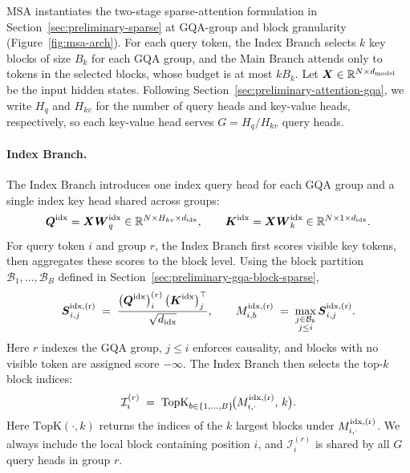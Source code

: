 \documentclass{llmxive}
\providecommand{\bm}[1]{\boldsymbol{#1}}
\providecommand{\R}{\mathbb{R}}
\providecommand{\method}{\textsc{MSA}}
\providecommand{\Figref}[1]{Figure~\ref{#1}}
\providecommand{\Secref}[1]{Section~\ref{#1}}
\providecommand{\mK}{{\bm{K}}}
\providecommand{\mQ}{{\bm{Q}}}
\providecommand{\mS}{{\bm{S}}}
\providecommand{\mW}{{\bm{W}}}
\providecommand{\mX}{{\bm{X}}}
\providecommand{\gB}{{\mathcal{B}}}
\providecommand{\gI}{{\mathcal{I}}}
\begin{document}
\method{} instantiates the two-stage sparse-attention formulation in \Secref{sec:preliminary-sparse} at GQA-group and block granularity (\Figref{fig:msa-arch}). For each query token, the Index Branch selects $k$ key blocks of size $B_k$ for each GQA group, and the Main Branch attends only to tokens in the selected blocks, whose budget is at most $kB_k$.
Let $\mX \in \R^{N \times d_{\rm model}}$ be the input hidden states. Following \Secref{sec:preliminary-attention-gqa}, we write $H_q$ and $H_{kv}$ for the number of query heads and key-value heads, respectively, so each key-value head serves $G = H_q/H_{kv}$ query heads.



\paragraph{Index Branch.} The Index Branch introduces one index query head for each GQA group and a single index key head shared across groups:
\begin{equation}
\label{eq:msa-index-proj}
\mQ^{\rm idx} = \mX \mW_q^{\rm idx} \in \R^{N \times H_{kv} \times d_{\rm idx}},
\qquad
\mK^{\rm idx} = \mX \mW_k^{\rm idx} \in \R^{N \times 1 \times d_{\rm idx}}.
\end{equation}
For query token $i$ and group $r$, the Index Branch first scores visible key tokens, then aggregates these scores to the block level. Using the block partition $\gB_1,\dots,\gB_B$ defined in \Secref{sec:preliminary-gqa-block-sparse},
\begin{equation}
\label{eq:msa-index-score}
\mS^{\rm idx,(r)}_{i,j}
\;=\;
\frac{\bigl(\mQ^{\rm idx}\bigr)^{(r)}_i \,\bigl(\mK^{\rm idx}\bigr)_j^{\top}}
     {\sqrt{d_{\rm idx}}},
\qquad
M^{\rm idx,(r)}_{i,b}
\;=\;
\max_{\substack{j \in \gB_b \\ j \le i}}
\mS^{\rm idx,(r)}_{i,j}.
\end{equation}
Here $r$ indexes the GQA group, $j \le i$ enforces causality, and blocks with no visible token are assigned score $-\infty$. The Index Branch then selects the top-$k$ block indices:
\begin{equation}
\label{eq:msa-topk}
\gI_i^{(r)}
\;=\;
\mathrm{TopK}_{b \in \{1,\dots,B\}}\!\bigl(M^{\rm idx,(r)}_{i,\cdot},\, k\bigr).
\end{equation}
Here $\mathrm{TopK}(\cdot, k)$ returns the indices of the $k$ largest blocks under $M^{\rm idx,(r)}_{i,\cdot}$. We always include the local block containing position $i$, and $\gI_i^{(r)}$ is shared by all $G$ query heads in group $r$.
\end{document}
